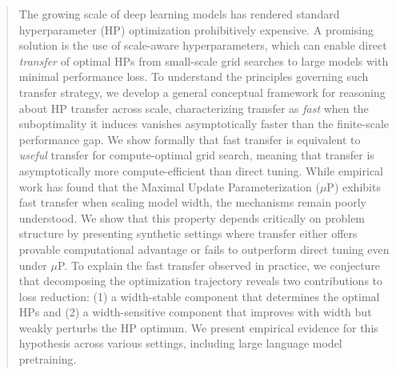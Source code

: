 \begin{abstract}
The growing scale of deep learning models has rendered standard hyperparameter (HP) optimization prohibitively expensive. A promising solution is the use of scale-aware hyperparameters, which can enable direct \emph{transfer} of optimal HPs from small-scale grid searches to large models with minimal performance loss. To understand the principles 
governing such transfer strategy, we develop a general conceptual framework for reasoning about HP transfer across scale, characterizing transfer as \emph{fast} when the suboptimality it induces vanishes asymptotically faster 
than the finite-scale performance gap. We show formally that fast transfer is equivalent to \emph{useful} transfer for compute-optimal grid search, meaning that transfer is asymptotically more compute-efficient than direct tuning. 
While empirical work has found that the Maximal Update Parameterization ($\mu$P) exhibits fast transfer when scaling model width, the mechanisms remain poorly understood. We show that this property depends critically on problem structure by presenting synthetic settings where transfer either offers provable computational advantage or fails to outperform direct tuning even under $\mu$P. To explain the fast transfer observed in practice, we conjecture that decomposing the optimization trajectory reveals two contributions to loss reduction: (1) a width-stable component that determines the optimal HPs and (2) a width-sensitive component that improves with width but weakly perturbs the HP optimum. We present empirical evidence for this hypothesis across various settings, including large language model pretraining.
\end{abstract}


